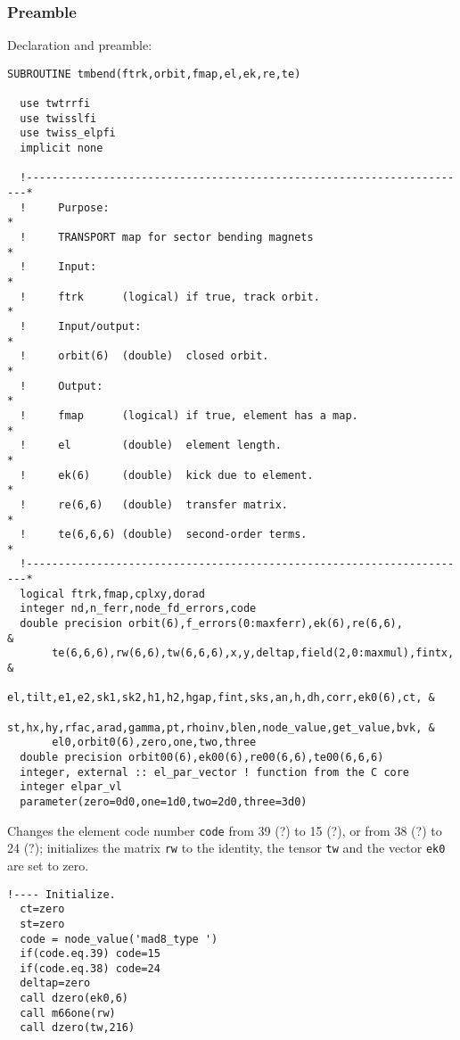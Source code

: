 \documentclass{cern-art} %
\begin{document}
\subsubsection{Preamble}
Declaration and preamble:
\begin{lstlisting}[firstnumber=auto]
SUBROUTINE tmbend(ftrk,orbit,fmap,el,ek,re,te)

  use twtrrfi
  use twisslfi
  use twiss_elpfi
  implicit none

  !----------------------------------------------------------------------*
  !     Purpose:                                                         *
  !     TRANSPORT map for sector bending magnets                         *
  !     Input:                                                           *
  !     ftrk      (logical) if true, track orbit.                        *
  !     Input/output:                                                    *
  !     orbit(6)  (double)  closed orbit.                                *
  !     Output:                                                          *
  !     fmap      (logical) if true, element has a map.                  *
  !     el        (double)  element length.                              *
  !     ek(6)     (double)  kick due to element.                         *
  !     re(6,6)   (double)  transfer matrix.                             *
  !     te(6,6,6) (double)  second-order terms.                          *
  !----------------------------------------------------------------------*
  logical ftrk,fmap,cplxy,dorad
  integer nd,n_ferr,node_fd_errors,code
  double precision orbit(6),f_errors(0:maxferr),ek(6),re(6,6),           &
       te(6,6,6),rw(6,6),tw(6,6,6),x,y,deltap,field(2,0:maxmul),fintx,   &
       el,tilt,e1,e2,sk1,sk2,h1,h2,hgap,fint,sks,an,h,dh,corr,ek0(6),ct, &
       st,hx,hy,rfac,arad,gamma,pt,rhoinv,blen,node_value,get_value,bvk, &
       el0,orbit0(6),zero,one,two,three
  double precision orbit00(6),ek00(6),re00(6,6),te00(6,6,6)
  integer, external :: el_par_vector ! function from the C core
  integer elpar_vl
  parameter(zero=0d0,one=1d0,two=2d0,three=3d0)
\end{lstlisting}

Changes the element code number \lstinline[firstnumber=last]{code}  from 39 (?) to 15 (?), or from 38 (?) to 24 (?); initializes the matrix \lstinline[firstnumber=last]{rw} to the identity, the tensor \lstinline[firstnumber=last]{tw} and the vector \lstinline[firstnumber=last]{ek0} are set to zero.
\begin{lstlisting}[firstnumber=last]
  !---- Initialize.
  ct=zero
  st=zero
  code = node_value('mad8_type ')
  if(code.eq.39) code=15
  if(code.eq.38) code=24
  deltap=zero
  call dzero(ek0,6)
  call m66one(rw)
  call dzero(tw,216)
\end{lstlisting}
\end{document}

